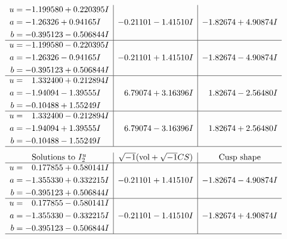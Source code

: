 \documentclass[1p]{elsarticle_modified}
\theoremstyle{definition}
\newcommand{\I}{\sqrt{-1}}
\begin{document}
$$\begin{array}{c|c|c}
\begin{aligned}
u &= -1.199580 + 0.220395 I \\
a &= -1.26326 + 0.94165 I \\
b &= -0.395123 - 0.506844 I\end{aligned}
 & -0.21101 - 1.41510 I & -1.82674 + 4.90874 I \\ \hline\begin{aligned}
u &= -1.199580 - 0.220395 I \\
a &= -1.26326 - 0.94165 I \\
b &= -0.395123 + 0.506844 I\end{aligned}
 & -0.21101 + 1.41510 I & -1.82674 - 4.90874 I \\ \hline\begin{aligned}
u &= \phantom{-}1.332400 + 0.212894 I \\
a &= -1.94094 - 1.39555 I \\
b &= -0.10488 + 1.55249 I\end{aligned}
 & \phantom{-}6.79074 + 3.16396 I & \phantom{-}1.82674 - 2.56480 I \\ \hline\begin{aligned}
u &= \phantom{-}1.332400 - 0.212894 I \\
a &= -1.94094 + 1.39555 I \\
b &= -0.10488 - 1.55249 I\end{aligned}
 & \phantom{-}6.79074 - 3.16396 I & \phantom{-}1.82674 + 2.56480 I\\
 \hline 
 \end{array}$$\newpage$$\begin{array}{c|c|c}  
\text{Solutions to }I^u_{2}& \I (\text{vol} + \sqrt{-1}CS) & \text{Cusp shape}\\
 \hline 
\begin{aligned}
u &= \phantom{-}0.177855 + 0.580141 I \\
a &= -1.355330 + 0.332215 I \\
b &= -0.395123 + 0.506844 I\end{aligned}
 & -0.21101 + 1.41510 I & -1.82674 - 4.90874 I \\ \hline\begin{aligned}
u &= \phantom{-}0.177855 - 0.580141 I \\
a &= -1.355330 - 0.332215 I \\
b &= -0.395123 - 0.506844 I\end{aligned}
 & -0.21101 - 1.41510 I & -1.82674 + 4.90874 I\\
 \hline 
 \end{array}$$\newpage\newpage\renewcommand{\arraystretch}{1}
\end{document}
